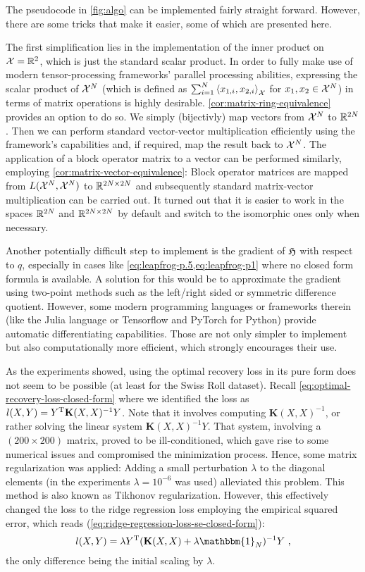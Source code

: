 The pseudocode in \cref{fig:algo} can be implemented fairly straight forward.
However, there are some tricks that make it easier, some of which are presented here.

The first simplification lies in the implementation of the inner product on $\mathcal{X} = \mathbb{R}^2$, which is just the standard scalar product.
In order to fully make use of modern tensor-processing frameworks' parallel processing abilities, expressing the scalar product of $\mathcal{X}^N$ (which is defined as $\sum_{i=1}^N \left<x_{1, i}, x_{2, i}\right>_{\mathcal{X}}$ for $x_1, x_2 \in \mathcal{X}^N$) in terms of matrix operations is highly desirable.
\cref{cor:matrix-ring-equivalence} provides an option to do so.
We simply (bijectivly) map vectors from $\mathcal{X}^N$ to $\mathbb{R}^{2N}$.
Then we can perform standard vector-vector multiplication efficiently using the framework's capabilities and, if required, map the result back to $\mathcal{X}^N$.
The application of a block operator matrix to a vector can be performed similarly, employing \cref{cor:matrix-vector-equivalence}:
Block operator matrices are mapped from $L(\mathcal{X}^N, \mathcal{X}^N)$ to $\mathbb{R}^{2N \times 2N}$ and subsequently standard matrix-vector multiplication can be carried out.
It turned out that it is easier to work in the spaces $\mathbb{R}^{2N}$ and $\mathbb{R}^{2N \times 2N}$ by default and switch to the isomorphic ones only when necessary.

Another potentially difficult step to implement is the gradient of $\mathfrak{H}$ with respect to $q$, especially in cases like \cref{eq:leapfrog-p.5,eq:leapfrog-p1} where no closed form formula is available.
A solution for this would be to approximate the gradient using two-point methods such as the left/right sided or symmetric difference quotient.
However, some modern programming languages or frameworks therein (like the Julia language or Tensorflow and PyTorch for Python) provide automatic differentiating capabilities.
Those are not only simpler to implement but also computationally more efficient, which strongly encourages their use.

As the experiments showed, using the optimal recovery loss in its pure form does not seem to be possible (at least for the Swiss Roll dataset).
Recall \cref{eq:optimal-recovery-loss-closed-form} where we identified the loss as $l(X, Y) = Y^{\mathrm{T}} \mathbf{K}(X, X)^{-1} Y$.
Note that it involves computing $\mathbf{K}(X, X)^{-1}$, or rather solving the linear system $\mathbf{K}(X, X)^{-1} Y$.
That system, involving a $(200\times200)$ matrix, proved to be ill-conditioned, which gave rise to some numerical issues and compromised the minimization process.
Hence, some matrix regularization was applied:
Adding a small perturbation $\lambda$ to the diagonal elements (in the experiments $\lambda = 10^{-6}$ was used) alleviated this problem.
This method is also known as Tikhonov regularization.
However, this effectively changed the loss to the ridge regression loss employing the empirical squared error, which reads (\cref{eq:ridge-regression-loss-se-closed-form}):
\begin{equation}
	l(X, Y) = \lambda Y^\T (\mathbf{K}(X, X) + \lambda \mathbbm{1}_N)^{-1} Y \ ,
\end{equation}
the only difference being the initial scaling by $\lambda$.

